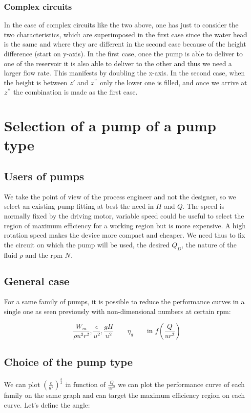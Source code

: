 \subsubsection{Complex circuits}

In the case of complex circuits like the two above, one has just to consider the two characteristics, which are superimposed in the first case since the water head is the same and where they are different in the second case because of the height difference (start on y-axis). In the first case, once the pump is able to deliver to one of the reservoir it is also able to deliver to the other and thus we need a larger flow rate. This manifests by doubling the x-axis. In the second case, when the height is between $z'$ and $z^"$ only the lower one is filled, and once we arrive at $z^"$ the combination is made as the first case. 

\section{Selection of a pump of a pump type}
\subsection{Users of pumps}
We take the point of view of the process engineer and not the designer, so we select an existing pump fitting at best the need in $H$ and $Q$. The speed is normally fixed by the driving motor, variable speed could be useful to select the region of maximum efficiency for a working region but is more expensive. A high rotation speed makes the device more compact and cheaper. We need thus to fix the circuit on which the pump will be used, the desired $Q_D$, the nature of the fluid $\rho$ and the rpm $N$. 

\subsection{General case}
For a same family of pumps, it is possible to reduce the performance curves in a single one as seen previously with non-dimensional numbers at certain rpm: 

\begin{equation}
\frac{W_m}{\rho u^3 r^2}, \frac{e}{u^2}, \frac{gH}{u^2} \qquad \eta _g\qquad \mbox{in } f\left(\frac{Q}{ur^2} \right)
\end{equation}

\subsection{Choice of the pump type}
We can plot $\left(\frac{e}{u^2}\right)^{\frac{3}{2}}$ in function of $\frac{Q}{ur^2}$ we can plot the performance curve of each family on the same graph and can target the maximum efficiency region on each curve. Let's define the angle:

